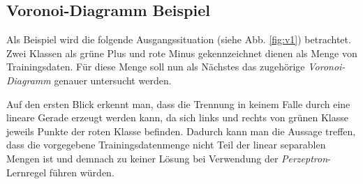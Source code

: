 \documentclass[fontsize=11pt]{scrartcl}
\begin{document}
        \subsection{Voronoi-Diagramm Beispiel}
        Als Beispiel wird die folgende Ausgangssituation (siehe Abb. \ref{fig:v1}) betrachtet. Zwei Klassen als grüne Plus und rote Minus gekennzeichnet dienen als Menge von Trainingsdaten. Für diese Menge soll nun als Nächstes das zugehörige \emph{Voronoi-Diagramm} genauer untersucht werden. \par
        Auf den ersten Blick erkennt man, dass die Trennung in keinem Falle durch eine lineare Gerade erzeugt werden kann, da sich links und rechts von grünen Klasse jeweils Punkte der roten Klasse befinden. Dadurch kann man die Aussage treffen, dass die vorgegebene Trainingsdatenmenge nicht Teil der linear separablen Mengen ist und demnach zu keiner Lösung bei Verwendung der \emph{Perzeptron}-Lernregel führen würden.
\end{document}
